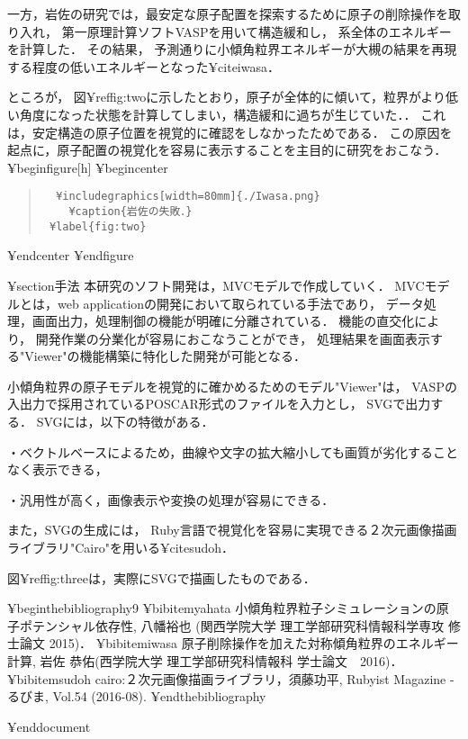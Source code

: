 \documentclass[12pt,a4paper]{jsarticle}
\begin{document}
一方，岩佐の研究では，最安定な原子配置を探索するために原子の削除操作を取り入れ，
第一原理計算ソフトVASPを用いて構造緩和し，
系全体のエネルギーを計算した．
その結果，
予測通りに小傾角粒界エネルギーが大槻の結果を再現する程度の低いエネルギーとなった¥cite{iwasa}．

ところが，
図¥ref{fig:two}に示したとおり，原子が全体的に傾いて，粒界がより低い角度になった状態を計算してしまい，構造緩和に過ちが生じていた．．
これは，安定構造の原子位置を視覚的に確認をしなかったためである．
この原因を起点に，原子配置の視覚化を容易に表示することを主目的に研究をおこなう．
¥begin{figure}[h]
¥begin{center}
\begin{quote}\begin{verbatim}
  ¥includegraphics[width=80mm]{./Iwasa.png}
    ¥caption{岩佐の失敗．}
 ¥label{fig:two}
\end{verbatim}\end{quote}
¥end{center}
¥end{figure}

¥section{手法}
本研究のソフト開発は，MVCモデルで作成していく．
MVCモデルとは，web applicationの開発において取られている手法であり，
データ処理，画面出力，処理制御の機能が明確に分離されている．
機能の直交化により，
開発作業の分業化が容易におこなうことができ， 
処理結果を画面表示する"Viewer"の機能構築に特化した開発が可能となる．

小傾角粒界の原子モデルを視覚的に確かめるためのモデル"Viewer"は，
VASPの入出力で採用されているPOSCAR形式のファイルを入力とし，
SVGで出力する．
SVGには，以下の特徴がある．

・ベクトルベースによるため，曲線や文字の拡大縮小しても画質が劣化することなく表示できる，

・汎用性が高く，画像表示や変換の処理が容易にできる．

また，SVGの生成には，
Ruby言語で視覚化を容易に実現できる２次元画像描画ライブラリ"Cairo"を用いる¥cite{sudoh}．

図¥ref{fig:three}は，実際にSVGで描画したものである．

¥begin{thebibliography}{9}
¥bibitem{yahata} 小傾角粒界粒子シミュレーションの原子ポテンシャル依存性, 八幡裕也 (関西学院大学 理工学部研究科情報科学専攻 修士論文 2015)．
¥bibitem{iwasa} 原子削除操作を加えた対称傾角粒界のエネルギー計算, 岩佐 恭佑(西学院大学 理工学部研究科情報科 学士論文　2016)． 
¥bibitem{sudoh} cairo:２次元画像描画ライブラリ，須藤功平, Rubyist Magazine - るびま, Vol.54 (2016-08).
¥end{thebibliography}

¥end{document}
\end{document}

